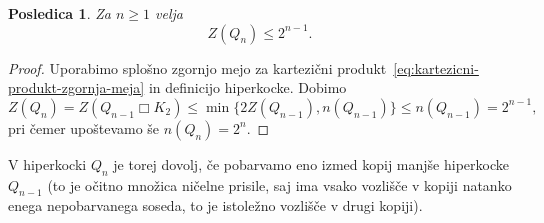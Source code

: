 \documentclass[12pt,a4paper,twoside]{article}
\theoremstyle{definition} %
\theoremstyle{plain} %
\newtheorem{posledica}[definicija]{Posledica}
\numberwithin{equation}{section}  %
\DeclareMathOperator{\boxempty}{\Box}
\begin{document}
\begin{posledica}
    Za $n \geq 1$ velja
    \begin{equation}
        \label{eq:hiperkocka-zgornja-meja}
        Z(Q_n) \leq 2^{n-1}.
    \end{equation}
\end{posledica}
\begin{proof}
    Uporabimo splošno zgornjo mejo za kartezični produkt~\eqref{eq:kartezicni-produkt-zgornja-meja} in definicijo hiperkocke. Dobimo
    \[
        Z(Q_n) = Z(Q_{n-1} \boxempty K_2) \leq \min \{ 2Z(Q_{n-1}), n(Q_{n-1}) \} \leq n(Q_{n-1}) = 2^{n-1},
    \]
    pri čemer upoštevamo še $n(Q_{n}) = 2^n$.
\end{proof}
V hiperkocki $Q_n$ je torej dovolj, če pobarvamo eno izmed kopij manjše hiperkocke $Q_{n-1}$ (to je očitno množica ničelne prisile, saj ima vsako vozlišče v kopiji natanko enega nepobarvanega soseda, to je istoležno vozlišče v drugi kopiji).

\end{document}
